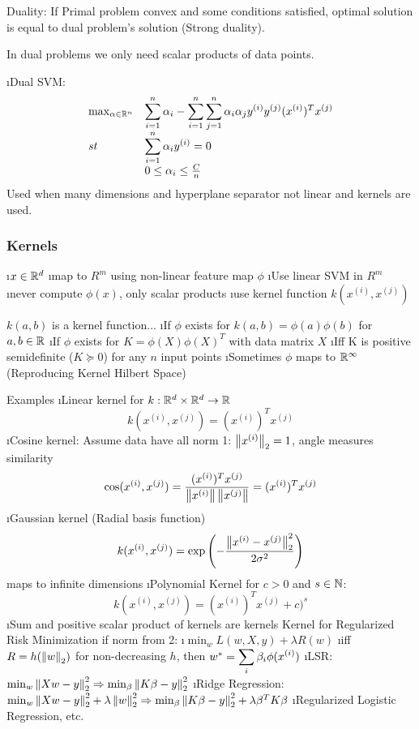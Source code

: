 Duality: If Primal problem convex and some conditions satisfied, optimal solution is equal to dual problem's solution (Strong duality).

In dual problems we only need scalar products of data points.

\be
\setcounter{enumi}{2}
\i Dual SVM: \[
\begin{array}{ll}
\max_{\alpha \in \mathbb{R}^n} & \displaystyle\sum^n_{{i}=1} \alpha_i - \displaystyle\sum^n_{{i}=1} \displaystyle\sum^n_{{j}=1} \alpha_i \alpha_j y^{(i)} y^{(j)} (x^{(i)})^T x^{(j)} \\
st & \displaystyle\sum^n_{{i}=1} \alpha_i y^{(i)} = 0 \\
& 0 \leq \alpha_i \leq \frac{C}{n}
\end{array}
\]
Used when many dimensions and hyperplane separator not linear and kernels are used.
\ee

\subsubsection{Kernels}

\bi
\i $x \in \mathbb{R}^d$
\i map to $R^m$ using non-linear feature map $\phi$
\i Use linear SVM in $R^m$
\i never compute $\phi(x)$, only scalar products
\i use kernel function $k(x^{(i)}, x^{(j)})$
\ei


$k(a,b)$ is a kernel function... 
\bi 
\i If $\phi$ exists for $k(a,b) = \phi(a)\phi(b)$ for $a,b \in \mathbb{R}$
\i If $\phi$ exists for $K = \phi(X)\phi(X)^T$ with data matrix $X$
\i Iff K is positive semidefinite ($K \succcurlyeq 0$) for any $n$ input points 
\bi
\i Sometimes $\phi$ maps to $\mathbb{R}^\infty$ (Reproducing Kernel Hilbert Space)
\ei
\ei

Examples
\bi
\i Linear kernel for $k: \mathbb{R}^d \times \mathbb{R}^d \to \mathbb{R}$ \[k(x^{(i)}, x^{(j)}) = (x^{(i)})^T x^{(j)}\]
\i Cosine kernel: Assume data have all norm 1: $\left\lVert x^{(i)}\right\rVert_2 = 1$, angle measures similarity
\[
\cos(x^{(i)}, x^{(j)}) = \frac{(x^{(i)})^T x^{(j)}}{\left\lVert x^{(i)}\right\rVert \left\lVert x^{(j)}\right\rVert} = (x^{(i)})^T x^{(j)}
\]
\i Gaussian kernel (Radial basis function) \[
k(x^{(i)}, x^{(j)}) = \exp\left(-\frac{\left\lVert x^{(i)} - x^{(j)}\right\rVert_2^2}{2\sigma^2}\right)
\]
maps to infinite dimensions
\i Polynomial Kernel for $c > 0$ and $s \in \mathbb{N}$:
\[
k(x^{(i)}, x^{(j)}) = (x^{(i)})^T x^{(j)} + c)^s
\]
\i Sum and positive scalar product of kernels are kernels
\ei
\newpage
Kernel for Regularized Risk Minimization if norm from 2:
\bi
\i $\min_w L(w,X,y) + \lambda R(w)$
\i iff $R = h(\left\lVert w\right\rVert_2)$ for non-decreasing $h$, then $w^* = \displaystyle\sum_i \beta_i \phi(x^{(i)})$
\i LSR: $\min_w \left\lVert Xw-y\right\rVert^2_2 \Rightarrow \min_\beta \left\lVert K\beta - y\right\rVert^2_2$ 
\i Ridge Regression: $\min_w \left\lVert Xw-y\right\rVert^2_2 + \lambda \left\lVert w\right\rVert_2^2 \Rightarrow \min_\beta \left\lVert K\beta - y\right\rVert^2_2 + \lambda \beta^T K \beta$
\i Regularized Logistic Regression, etc.
\ei

